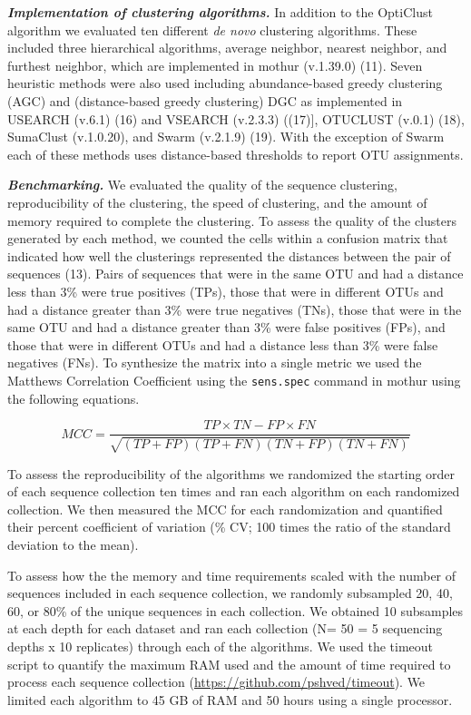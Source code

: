 \documentclass[11pt,]{article}
\begin{document}
\textbf{\emph{Implementation of clustering algorithms.}} In addition to
the OptiClust algorithm we evaluated ten different \emph{de novo}
clustering algorithms. These included three hierarchical algorithms,
average neighbor, nearest neighbor, and furthest neighbor, which are
implemented in mothur (v.1.39.0) (11). Seven heuristic methods were also
used including abundance-based greedy clustering (AGC) and
(distance-based greedy clustering) DGC as implemented in USEARCH (v.6.1)
(16) and VSEARCH (v.2.3.3) ((17){]}, OTUCLUST (v.0.1) (18), SumaClust
(v.1.0.20), and Swarm (v.2.1.9) (19). With the exception of Swarm each
of these methods uses distance-based thresholds to report OTU
assignments.

\textbf{\emph{Benchmarking.}} We evaluated the quality of the sequence
clustering, reproducibility of the clustering, the speed of clustering,
and the amount of memory required to complete the clustering. To assess
the quality of the clusters generated by each method, we counted the
cells within a confusion matrix that indicated how well the clusterings
represented the distances between the pair of sequences (13). Pairs of
sequences that were in the same OTU and had a distance less than 3\%
were true positives (TPs), those that were in different OTUs and had a
distance greater than 3\% were true negatives (TNs), those that were in
the same OTU and had a distance greater than 3\% were false positives
(FPs), and those that were in different OTUs and had a distance less
than 3\% were false negatives (FNs). To synthesize the matrix into a
single metric we used the Matthews Correlation Coefficient using the
\texttt{sens.spec} command in mothur using the following equations.

\[
MCC = \frac{TP \times TN-FP \times FN}{\sqrt{(TP+FP)(TP+FN)(TN+FP)(TN+FN)} }
\]

To assess the reproducibility of the algorithms we randomized the
starting order of each sequence collection ten times and ran each
algorithm on each randomized collection. We then measured the MCC for
each randomization and quantified their percent coefficient of variation
(\% CV; 100 times the ratio of the standard deviation to the mean).

To assess how the the memory and time requirements scaled with the
number of sequences included in each sequence collection, we randomly
subsampled 20, 40, 60, or 80\% of the unique sequences in each
collection. We obtained 10 subsamples at each depth for each dataset and
ran each collection (N= 50 = 5 sequencing depths x 10 replicates)
through each of the algorithms. We used the timeout script to quantify
the maximum RAM used and the amount of time required to process each
sequence collection (\url{https://github.com/pshved/timeout}). We
limited each algorithm to 45 GB of RAM and 50 hours using a single
processor.
\end{document}

